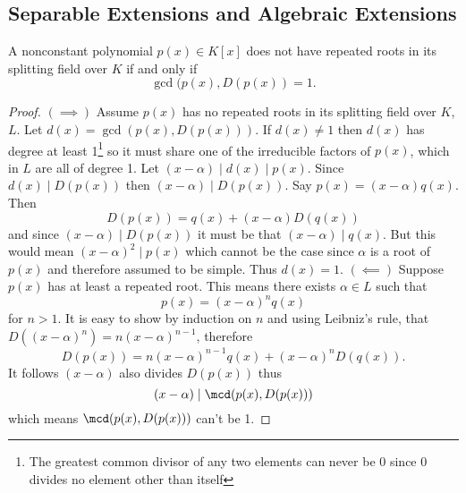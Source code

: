\documentclass[12pt,oneside]{book}
\begin{document}
\subsection{Separable Extensions and Algebraic Extensions}
\begin{lemma}\label{lemma:repeated roots if and only if polynomial and derivative are
	relatively prime}
	A nonconstant polynomial \( p(x) \in K[x] \) does not have repeated roots in its
	splitting field over \( K \) if and only if
	\begin{equation*}
		\gcd(p(x), D(p(x)) = 1.
	\end{equation*}
\end{lemma}
\begin{proof}
	\( (\implies) \) Assume \( p(x) \) has no repeated roots in its splitting field over \(
	K\), \( L \). Let \( d(x) = \gcd(p(x), D(p(x))) \). If \( d(x) \neq 1 \) then \( d(x) \)
	has degree at least 1\footnote{The greatest common divisor of any two elements can never
	be 0 since 0 divides no element other than itself} so it must share one of the
	irreducible factors of \( p(x) \), which in \( L \) are all of degree 1. Let \(
	(x-\alpha) \mid d(x) \mid p(x) \). Since \( d(x) \mid D(p(x)) \) then \( (x -
	\alpha) \mid D(p(x)) \). Say \( p(x) = (x - \alpha)q(x) \). Then
	\begin{equation*}
		D(p(x)) = q(x) + (x - \alpha)D(q(x))
	\end{equation*}
	and since \( (x - \alpha) \mid D(p(x)) \) it must be that \( (x - \alpha) \mid q(x) \).
	But this would mean \( (x - \alpha)^2 \mid p(x) \) which cannot be the case since \(
	\alpha \) is a root of \( p(x) \) and therefore assumed to be simple. Thus \( d(x) = 1
	\).
	\( (\impliedby) \) Suppose \( p(x) \) has at least a repeated root. This means there
	exists \( \alpha \in L \) such that 
	\begin{equation*}
		p(x) = (x - \alpha)^nq(x)
	\end{equation*}
	for \( n > 1 \). It is easy to show by induction on \( n \) and using Leibniz's rule,
	that \( D((x - \alpha)^n) = n(x -\alpha)^{n-1} \), therefore
	\begin{equation*}
		D(p(x)) = n(x - \alpha)^{n-1}q(x) + (x - \alpha)^nD(q(x)).
	\end{equation*}
	It follows \( (x - \alpha) \) also divides \( D(p(x)) \) thus
	\begin{equation*}
		(x - \alpha) \mid \mcd(p(x), D(p(x)))
	\end{equation*}
	which means \( \mcd(p(x), D(p(x))) \) can't be 1.
\end{proof}
\end{document}
